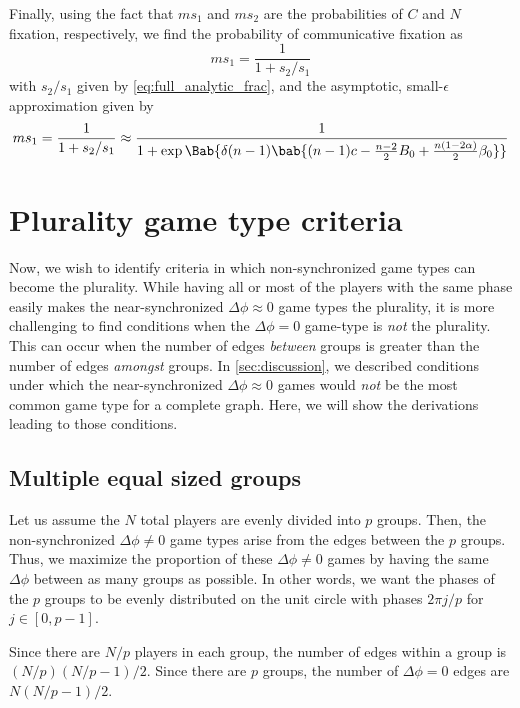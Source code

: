 Finally, using the fact that $m s_1$ and $m s_2$
are the probabilities of $C$ and $N$ fixation, respectively,
we find the probability of communicative fixation as
\begin{equation}
  m s_1 = \frac{1}{1 + s_2/s_1}
  \label{eq:full_analytic}
\end{equation}
with $s_2/s_1$ given by \cref{eq:full_analytic_frac},
and the asymptotic, small-$\epsilon$ approximation given by
\begin{equation}
  m s_1 = \frac{1}{1 + s_2/s_1}
  \approx
  \frac{1}
  {1 + \exp \Bab{\delta (n-1) \bab{
    (n-1) c
    - \frac{n-2}{2} B_0
    +
    \frac{n (1 - 2 \alpha)}{2} \beta_0
    }}
  }
  \label{eq:analytic_first_term}
\end{equation}

\section{Plurality game type criteria}
Now, we wish to identify criteria in which
non-synchronized game types can become the plurality.
While having all or most of the players with the same phase
easily makes the near-synchronized $\Delta \phi \approx 0$
game types the plurality,
it is more challenging to find conditions
when the $\Delta \phi = 0$ game-type is \emph{not} the plurality.
This can occur when the number of edges \emph{between} groups
is greater than the number of edges \emph{amongst} groups.
In \cref{sec:discussion}, we described conditions under which
the near-synchronized $\Delta \phi \approx 0$ games would \emph{not} be
the most common game type for a complete graph.
Here, we will show the derivations leading to those conditions.

\subsection{Multiple equal sized groups}\label{sec:multiple_equal_groups}
Let us assume the $N$ total players are evenly divided
into $p$ groups.
Then, the non-synchronized $\Delta \phi \neq 0$ game types
arise from the edges between the $p$ groups.
Thus, we maximize the proportion of these $\Delta \phi \neq 0$ games
by having the same $\Delta \phi$ between as many groups as possible.
In other words, we want the phases of the $p$ groups
to be evenly distributed on the unit circle with phases $2 \pi j/p$
for $j \in [0,p-1]$.

Since there are $N/p$ players in each group,
the number of edges within a group is $(N/p)(N/p - 1)/2$.
Since there are $p$ groups, the number of $\Delta \phi = 0$ edges are
$N (N/p - 1)/2$.

